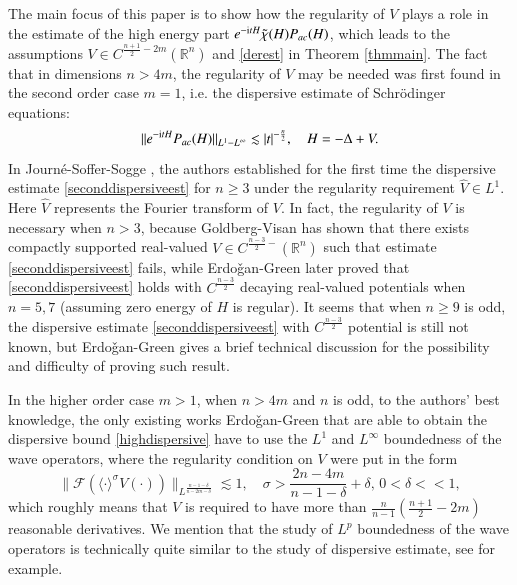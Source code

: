 \documentclass[11pt,reqno]{amsart}
\def\i{{\rm i}}
\numberwithin{equation}{section}
\theoremstyle{definition}
\begin{document}
The main focus of this paper is to show how the regularity of $V$ plays a role in the estimate of the high energy part $e^{-\i tH}\tilde{\chi}(H)P_{ac}(H)$, which leads to the assumptions $V\in C^{\frac{n+1}{2}-2m}(\mathbb{R}^n)$ and \eqref{derest} in Theorem \ref{thmmain}. The fact that in dimensions $n>4m$, the regularity of $V$ may be needed was first found in the second order case $m=1$, i.e. the dispersive estimate of Schr\"{o}dinger equations:
\begin{equation}\label{seconddispersiveest}
	\|e^{-\i tH}P_{ac}(H)\|_{L^1-L^\infty}\lesssim|t|^{-\frac n2},\quad H=-\Delta+V.
\end{equation}
In Journ\'{e}-Soffer-Sogge  \cite{JSS},  the authors  established for the first time the dispersive estimate  \eqref{seconddispersiveest} for $n\geq3$ under the regularity requirement $\hat{V}\in L^1$. Here $\hat{V}$ represents the Fourier transform of $V$. In fact, the regularity of $V$ is necessary when $n>3$, because Goldberg-Visan \cite{GV} has shown that there exists compactly supported real-valued $V\in C^{\frac{n-3}{2}-}(\mathbb{R}^n)$ such that estimate \eqref{seconddispersiveest} fails, while Erdo\v{g}an-Green \cite{EG10} later proved that \eqref{seconddispersiveest} holds with $C^{\frac{n-3}{2}}$ decaying real-valued potentials when $n=5,7$ (assuming zero energy of $H$ is regular). It seems that when $n\geq9$ is odd, the dispersive estimate \eqref{seconddispersiveest} with $C^{\frac{n-3}{2}}$ potential is still not known, but Erdo\v{g}an-Green \cite{EG10} gives a brief technical discussion for the possibility and difficulty of proving such result.

In the higher order case $m>1$, when $n>4m$ and $n$ is odd, to the authors' best knowledge, the only existing works Erdo\v{g}an-Green \cite{EG22,EG23} that are able to obtain the dispersive bound \eqref{highdispersive} have to use the $L^1$ and $L^\infty$ boundedness of the wave operators, where the regularity condition on $V$ were put in the form
\begin{equation}
	\|\mathscr{F}(\langle\cdot\rangle^\sigma V(\cdot))\|_{L^\frac{n-1-\delta}{n-2m-\delta}}\lesssim1,\quad \sigma>\mbox{$\frac{2n-4m}{n-1-\delta}+\delta$},\,0<\delta<<1,
\end{equation}
which roughly means that $V$ is required to have more than $\frac{n}{n-1}(\frac{n+1}{2}-2m)$ reasonable derivatives. We mention that the study of $L^p$ boundedness of the wave operators is technically quite similar to the study of dispersive estimate, see \cite{EGL,GG21,MWY,GY} for example. 
\end{document}
